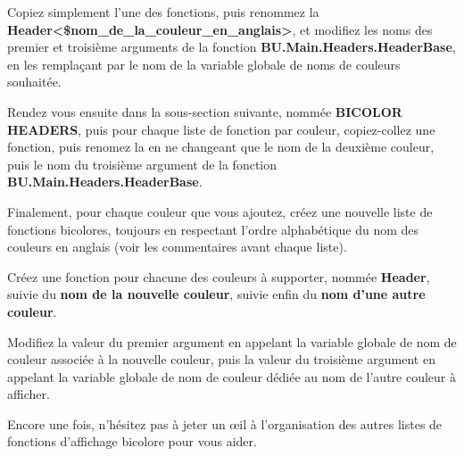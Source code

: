 \documentclass[a4paper,10pt]{article}
\begin{document}
    \begin{justify}
        Copiez simplement l'une des fonctions, puis renommez la \textbf{\color{mauve}Header<\$nom\_de\_la\_couleur\_en\_anglais>},
    et modifiez les noms des premier et troisième arguments de la fonction \textbf{\color{mauve}BU.Main.Headers.HeaderBase}, en les
    remplaçant par le nom de la variable globale de noms de couleurs souhaitée.
    \end{justify}

    \begin{justify}
        Rendez vous ensuite dans la sous-section suivante, nommée \textbf{BICOLOR HEADERS}, puis pour chaque liste de fonction par couleur, copiez-collez une fonction, puis renomez la en ne changeant que le nom de la deuxième couleur, puis le nom du troisième argument de la fonction \textbf{\color{mauve}BU.Main.Headers.HeaderBase}.
    \end{justify}

    \begin{justify}
        Finalement, pour chaque couleur que vous ajoutez, créez une nouvelle liste de fonctions bicolores,
    toujours en respectant l'ordre alphabétique du nom des couleurs en anglais (voir les commentaires
    avant chaque liste).
    \end{justify}

    \begin{justify}
        Créez une fonction pour chacune des couleurs à supporter, nommée \textbf{\color{mauve}Header}, suivie du \textbf{\color{mauve}nom de la nouvelle couleur}, suivie enfin du \textbf{\color{mauve}nom d'une autre couleur}.
    \end{justify}

    \begin{justify}
        Modifiez la valeur du premier argument en appelant la variable globale de nom de couleur associée à la nouvelle couleur, puis la valeur du troisième argument en appelant la variable globale de nom de couleur dédiée au nom de l'autre couleur à afficher.
    \end{justify}

    \begin{justify}
        Encore une fois, n'hésitez pas à jeter un œil à l'organisation des autres listes de fonctions d'affichage bicolore pour vous aider.
    \end{justify}


\end{document}

